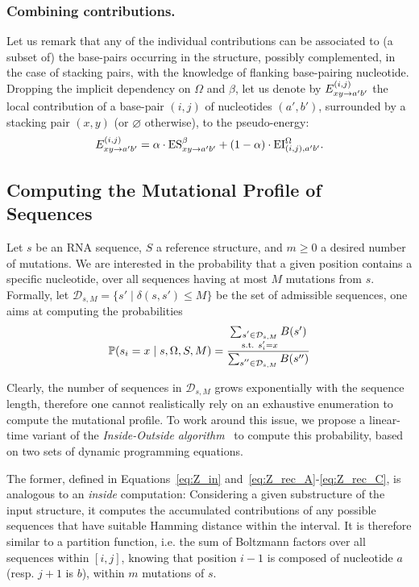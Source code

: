 \subsubsection{Combining contributions.}
Let us remark that any of the individual contributions can be associated to (a subset of) the base-pairs occurring in the structure, possibly complemented, in the case of stacking pairs, with the knowledge of flanking base-pairing nucleotide.
Dropping the implicit dependency on $\Omega$ and $\beta$, let us denote by $E^{(i,j)}_{{xy}\to{a'b'}}$ the local contribution of a base-pair $(i,j)$ of nucleotides $(a',b')$, surrounded by a stacking pair $(x,y)$ (or $\varnothing$ otherwise), to the pseudo-energy:
\begin{equation}
  E^{(i,j)}_{{xy}\to{a'b'}}  = \alpha \cdot\text{ES}^\beta_{xy \to a' b'}+(1-\alpha)\cdot\text{EI}^{\Omega}_{(i,j),a'b'}.
\end{equation}

\subsection{Computing the Mutational Profile of Sequences}


Let $s$ be an RNA sequence, $S$ a reference structure, and $m\geq 0$ a desired number of mutations. 
We are interested in  the probability that a given position contains a specific nucleotide, over all sequences having at most $M$ mutations from $s$. Formally, let $\mathcal{D}_{s,M}=\{s'\;|\;\delta(s,s')\le M\}$ be the set of admissible sequences, one aims at computing the probabilities
\begin{equation}
\mathbb{P}(s_i = x\mid s,\Omega, S,M) = \frac{\sum_{\substack{s'\in\mathcal{D}_{s,M}\\\text{s.t. }s'_{i}=x}}B(s')}{\sum_{\substack{s''\in\mathcal{D}_{s,M}}}B(s'')}
\end{equation}

 
Clearly, the number of sequences in $\mathcal{D}_{s,M}$ grows exponentially with the sequence length, therefore one cannot realistically rely on an exhaustive enumeration to compute the mutational profile. To work around this issue, we propose a linear-time variant of the
 \emph{Inside-Outside algorithm}~\cite{Lari1990} to compute this probability, based on two sets of dynamic programming equations. 

The former, defined in Equations~\eqref{eq:Z_in} and~\eqref{eq:Z_rec_A}-\eqref{eq:Z_rec_C}, is analogous to an \emph{inside} computation: Considering a given substructure of the input structure, it computes the accumulated contributions of any possible sequences that have suitable Hamming distance within the interval. It is therefore similar to a partition function, i.e. the sum of Boltzmann factors over all sequences within $[i,j]$, 
knowing that position $i-1$ is composed of nucleotide $a$ (resp. $j+1$ is $b$), within 
$m$ mutations of $s$. 

